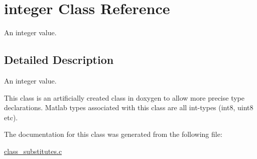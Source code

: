 \hypertarget{a00008}{\section{integer Class Reference}
\label{a00008}
}


An integer value.  




\subsection{Detailed Description}
An integer value. 

This class is an artificially created class in doxygen to allow more precise type declarations. Matlab types associated with this class are all int-\/types (int8, uint8 etc). 

The documentation for this class was generated from the following file\-:\begin{DoxyCompactItemize}
\item 
\hyperlink{a00016}{class\-\_\-substitutes.\-c}\end{DoxyCompactItemize}
